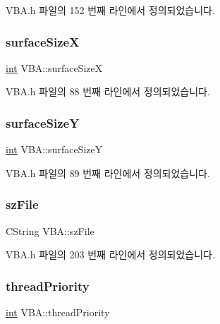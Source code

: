 V\+B\+A.\+h 파일의 152 번째 라인에서 정의되었습니다.

\mbox{\label{class_v_b_a_a14ab3c3ab83f07d70e2a40090e37deea}} 
\subsubsection{\texorpdfstring{surface\+SizeX}{surfaceSizeX}}
{\footnotesize\ttfamily \mbox{\hyperlink{_util_8cpp_a0ef32aa8672df19503a49fab2d0c8071}{int}} V\+B\+A\+::surface\+SizeX}



V\+B\+A.\+h 파일의 88 번째 라인에서 정의되었습니다.

\mbox{\label{class_v_b_a_a63dc67ff3aa9347f32f583fee92cf609}} 
\subsubsection{\texorpdfstring{surface\+SizeY}{surfaceSizeY}}
{\footnotesize\ttfamily \mbox{\hyperlink{_util_8cpp_a0ef32aa8672df19503a49fab2d0c8071}{int}} V\+B\+A\+::surface\+SizeY}



V\+B\+A.\+h 파일의 89 번째 라인에서 정의되었습니다.

\mbox{\label{class_v_b_a_ac85720ef4e00c5455be15266b7119045}} 
\subsubsection{\texorpdfstring{sz\+File}{szFile}}
{\footnotesize\ttfamily C\+String V\+B\+A\+::sz\+File}



V\+B\+A.\+h 파일의 203 번째 라인에서 정의되었습니다.

\mbox{\label{class_v_b_a_acde3a2cf1f42d8222850f9e8b5b28316}} 
\subsubsection{\texorpdfstring{thread\+Priority}{threadPriority}}
{\footnotesize\ttfamily \mbox{\hyperlink{_util_8cpp_a0ef32aa8672df19503a49fab2d0c8071}{int}} V\+B\+A\+::thread\+Priority}



